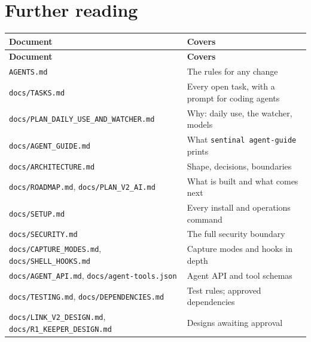 \section{\texorpdfstring{Further reading}{Further reading}}

\begin{small}
\begin{longtable}{>{\raggedright\arraybackslash}p{0.573\dimexpr \linewidth-4\tabcolsep\relax}>{\raggedright\arraybackslash}p{0.427\dimexpr \linewidth-4\tabcolsep\relax}}
\toprule
\textbf{Document} & \textbf{Covers} \\
\midrule
\endfirsthead
\toprule
\textbf{Document} & \textbf{Covers} \\
\midrule
\endhead
\texttt{AGENTS.\allowbreak{}md} & The rules for any change \\
\texttt{docs/\allowbreak{}TASKS.\allowbreak{}md} & Every open task, with a prompt for coding agents \\
\texttt{docs/\allowbreak{}PLAN\_\allowbreak{}DAILY\_\allowbreak{}USE\_\allowbreak{}AND\_\allowbreak{}WATCHER.\allowbreak{}md} & Why: daily use, the watcher, models \\
\texttt{docs/\allowbreak{}AGENT\_\allowbreak{}GUIDE.\allowbreak{}md} & What \texttt{sentinal\ agent-{}\allowbreak{}guide} prints \\
\texttt{docs/\allowbreak{}ARCHITECTURE.\allowbreak{}md} & Shape, decisions, boundaries \\
\texttt{docs/\allowbreak{}ROADMAP.\allowbreak{}md}, \texttt{docs/\allowbreak{}PLAN\_\allowbreak{}V2\_\allowbreak{}AI.\allowbreak{}md} & What is built and what comes next \\
\texttt{docs/\allowbreak{}SETUP.\allowbreak{}md} & Every install and operations command \\
\texttt{docs/\allowbreak{}SECURITY.\allowbreak{}md} & The full security boundary \\
\texttt{docs/\allowbreak{}CAPTURE\_\allowbreak{}MODES.\allowbreak{}md}, \texttt{docs/\allowbreak{}SHELL\_\allowbreak{}HOOKS.\allowbreak{}md} & Capture modes and hooks in depth \\
\texttt{docs/\allowbreak{}AGENT\_\allowbreak{}API.\allowbreak{}md}, \texttt{docs/\allowbreak{}agent-{}\allowbreak{}tools.\allowbreak{}json} & Agent API and tool schemas \\
\texttt{docs/\allowbreak{}TESTING.\allowbreak{}md}, \texttt{docs/\allowbreak{}DEPENDENCIES.\allowbreak{}md} & Test rules; approved dependencies \\
\texttt{docs/\allowbreak{}LINK\_\allowbreak{}V2\_\allowbreak{}DESIGN.\allowbreak{}md}, \texttt{docs/\allowbreak{}R1\_\allowbreak{}KEEPER\_\allowbreak{}DESIGN.\allowbreak{}md} & Designs awaiting approval \\
\bottomrule
\end{longtable}
\end{small}
